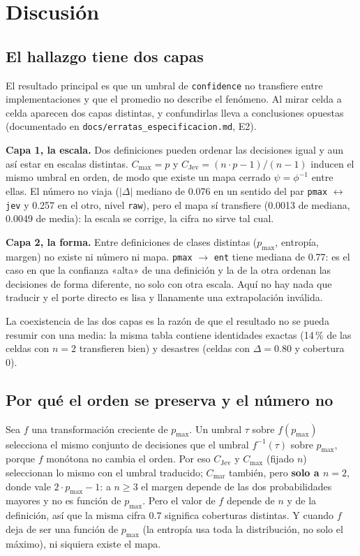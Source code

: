\section{Discusión}
\label{sec:discusion}

\subsection{El hallazgo tiene dos capas}

El resultado principal es que un umbral de \texttt{confidence} no transfiere entre implementaciones y que el
promedio no describe el fenómeno. Al mirar celda a celda aparecen dos capas distintas, y confundirlas lleva a conclusiones opuestas (documentado en \texttt{docs/erratas\_especificacion.md}, E2).

\textbf{Capa 1, la escala.} Dos definiciones pueden ordenar las decisiones igual y aun así estar en escalas distintas. $C_{\max}=p$ y $C_{\mathrm{Jev}}=(n\cdot p-1)/(n-1)$ inducen el mismo umbral en orden, de modo que existe un mapa cerrado $\psi=\phi^{-1}$ entre ellas. El número no viaja ($|\Delta|$ mediano de 0.076 en un sentido del par \texttt{pmax} $\leftrightarrow$ \texttt{jev} y 0.257 en el otro, nivel \texttt{raw}), pero el mapa sí transfiere (0.0013 de mediana, 0.0049 de media): la escala se corrige, la cifra no sirve tal cual.

\textbf{Capa 2, la forma.} Entre definiciones de clases distintas ($p_{\max}$, entropía, margen) no existe ni número ni mapa. \texttt{pmax} $\to$ \texttt{ent} tiene mediana de 0.77: es el caso en que la confianza «alta» de una definición y la de la otra ordenan las decisiones de forma diferente, no solo con otra escala. Aquí no hay nada que traducir y el porte directo es lisa y llanamente una extrapolación inválida.

La coexistencia de las dos capas es la razón de que el resultado no se pueda resumir con una media: la misma tabla contiene identidades exactas (14\,\% de las celdas con $n=2$ transfieren bien) y desastres (celdas con $\Delta=0.80$ y cobertura 0).

\subsection{Por qué el orden se preserva y el número no}

Sea $f$ una transformación creciente de $p_{\max}$. Un umbral $\tau$ sobre $f(p_{\max})$ selecciona el mismo conjunto de decisiones que el umbral $f^{-1}(\tau)$ sobre $p_{\max}$, porque $f$ monótona no cambia el orden. Por eso $C_{\mathrm{Jev}}$ y $C_{\max}$ (fijado $n$) seleccionan lo mismo con el umbral traducido; $C_{\mathrm{mar}}$ también, pero \textbf{solo a $n = 2$}, donde vale $2\cdot p_{\max}-1$: a $n \ge 3$ el margen depende de las dos probabilidades mayores y no es función de $p_{\max}$. Pero el valor de $f$ depende de $n$ y de la definición, así que la misma cifra $0.7$ significa coberturas distintas. Y cuando $f$ deja de ser una función de $p_{\max}$ (la entropía usa toda la distribución, no solo el máximo), ni siquiera existe el mapa.


